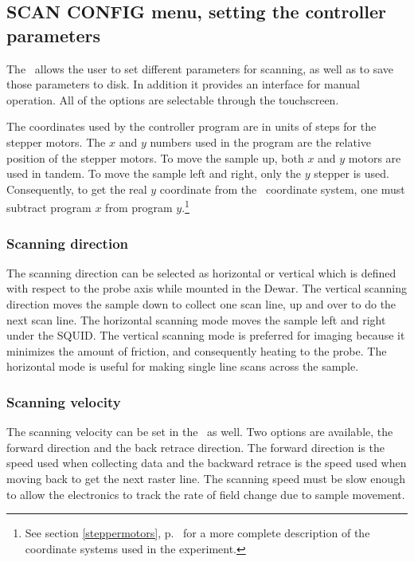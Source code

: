 \subsection{SCAN CONFIG menu, setting the controller parameters}
\label{scanconfigmenu}

The \squidbox\ allows the user to set different parameters for
scanning, as well as to save those parameters to disk. In addition it 
provides an interface for manual operation. All of the options are
selectable through the touchscreen. 

The coordinates used by the controller program are in units of steps 
for the stepper motors. The $x$ and $y$ numbers used in the program
are the relative position of the stepper motors. To move the sample
up, both $x$ and $y$ motors are used in tandem. To move the sample
left and right, only the $y$ stepper is used. Consequently, to get
the real $y$ coordinate from the \squidbox\ coordinate system, one
must subtract program $x$ from program 
$y$.\footnote{See section \ref{steppermotors},
p.~\pageref{steppermotors} for a more complete description of the 
coordinate systems used in the experiment.}   

\subsubsection{Scanning direction}
The scanning direction can be selected as horizontal or vertical
which is defined with respect to the probe axis while mounted in the
Dewar. 
The vertical scanning direction moves the sample down to collect
one scan line, up and over to do the next scan line. The horizontal
scanning mode moves the sample left and right under the SQUID. 
The vertical scanning mode is preferred for imaging because it minimizes the 
amount of friction, and consequently heating to the probe.
The horizontal mode is useful for making single line scans
across the sample. 

\subsubsection{Scanning velocity}
The scanning velocity can be set in the \squidbox\ as well. Two options
are available, the forward direction and the back retrace direction.
The forward direction is the speed used when collecting data and
the backward retrace is the speed used when moving back to get the
next raster line. The scanning speed must be slow enough to allow
the electronics to track the rate of field change due to 
sample movement. 

